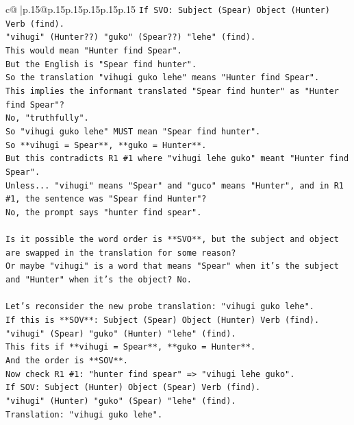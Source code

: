 \documentclass{article}
\begin{document}
{\begin{supertabular}{c@{$\;$}|p{.15\linewidth}@{}p{.15\linewidth}p{.15\linewidth}p{.15\linewidth}p{.15\linewidth}p{.15\linewidth}}
{{{\texttt{If SVO: Subject (Spear) Object (Hunter) Verb (find).} \\
\texttt{"vihugi" (Hunter??) "guko" (Spear??) "lehe" (find).} \\
\texttt{This would mean "Hunter find Spear".} \\
\texttt{But the English is "Spear find hunter".} \\
\texttt{So the translation "vihugi guko lehe" means "Hunter find Spear".} \\
\texttt{This implies the informant translated "Spear find hunter" as "Hunter find Spear"?} \\
\texttt{No, "truthfully".} \\
\texttt{So "vihugi guko lehe" MUST mean "Spear find hunter".} \\
\texttt{So **vihugi = Spear**, **guko = Hunter**.} \\
\texttt{But this contradicts R1 \#1 where "vihugi lehe guko" meant "Hunter find Spear".} \\
\texttt{Unless... "vihugi" means "Spear" and "guco" means "Hunter", and in R1 \#1, the sentence was "Spear find Hunter"?} \\
\texttt{No, the prompt says "hunter find spear".} \\
\\ 
\texttt{Is it possible the word order is **SVO**, but the subject and object are swapped in the translation for some reason?} \\
\texttt{Or maybe "vihugi" is a word that means "Spear" when it's the subject and "Hunter" when it's the object? No.} \\
\\ 
\texttt{Let's reconsider the new probe translation: "vihugi guko lehe".} \\
\texttt{If this is **SOV**: Subject (Spear) Object (Hunter) Verb (find).} \\
\texttt{"vihugi" (Spear) "guko" (Hunter) "lehe" (find).} \\
\texttt{This fits if **vihugi = Spear**, **guko = Hunter**.} \\
\texttt{And the order is **SOV**.} \\
\texttt{Now check R1 \#1: "hunter find spear" => "vihugi lehe guko".} \\
\texttt{If SOV: Subject (Hunter) Object (Spear) Verb (find).} \\
\texttt{"vihugi" (Hunter) "guko" (Spear) "lehe" (find).} \\
\texttt{Translation: "vihugi guko lehe".} \\
}}}
\end{supertabular}}
\end{document}
